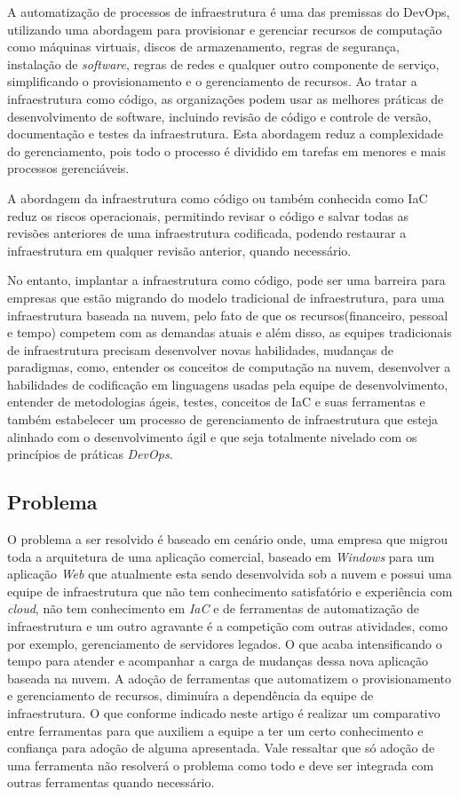 A automatização de processos de infraestrutura é uma das premissas do DevOps, utilizando uma abordagem para provisionar e gerenciar recursos de computação como máquinas virtuais, discos de armazenamento, regras de segurança, instalação de \textit{software}, regras de redes e qualquer outro componente de serviço, simplificando o provisionamento e o gerenciamento de recursos. Ao tratar a infraestrutura como código, as organizações podem usar as melhores práticas de desenvolvimento de software, incluindo revisão de código e controle de versão, documentação e testes da infraestrutura. Esta abordagem reduz a complexidade do gerenciamento, pois todo o processo é dividido em tarefas em menores e mais processos gerenciáveis.

A abordagem da infraestrutura como código ou também conhecida como IaC reduz os riscos operacionais, permitindo revisar o código e salvar todas as revisões anteriores de uma infraestrutura codificada, podendo restaurar a infraestrutura em qualquer revisão anterior, quando necessário. \cite{Morris:2016:ICM:3006361}

No entanto, implantar a infraestrutura como código, pode ser uma barreira para empresas que estão migrando do modelo tradicional de infraestrutura, para uma infraestrutura baseada na nuvem, pelo fato de que os recursos(financeiro, pessoal e tempo) competem com as demandas atuais e além disso, as equipes tradicionais de infraestrutura precisam desenvolver novas habilidades, mudanças de paradigmas, como, entender os conceitos de computação na nuvem, desenvolver a habilidades de codificação em linguagens usadas pela equipe de desenvolvimento, entender de metodologias ágeis, testes, conceitos de IaC e suas ferramentas e também estabelecer um processo de gerenciamento de infraestrutura que esteja alinhado com o desenvolvimento ágil e que seja totalmente nivelado com os princípios de práticas \textit{DevOps}. 


\subsection{Problema}

O problema a ser resolvido é baseado em cenário onde, uma empresa que migrou toda a arquitetura de uma aplicação comercial, baseado em \textit{Windows} para um aplicação \textit{Web} que atualmente esta sendo desenvolvida sob a nuvem e possui uma equipe de infraestrutura que não tem conhecimento satisfatório e experiência com \textit{cloud}, não tem conhecimento em \textit{IaC} e de ferramentas de automatização de infraestrutura e um outro agravante é a competição com outras atividades, como por exemplo, gerenciamento de servidores legados. O que acaba intensificando o tempo para atender e acompanhar a carga de mudanças dessa nova aplicação baseada na nuvem. A adoção de ferramentas que automatizem o provisionamento e gerenciamento de recursos, diminuíra a dependência da equipe de infraestrutura. O que conforme indicado neste artigo é realizar um comparativo entre ferramentas para que auxiliem a equipe a ter um certo conhecimento e confiança para adoção de alguma apresentada. Vale ressaltar que só adoção de uma ferramenta não resolverá o problema como todo e deve ser integrada com outras ferramentas quando necessário. 

